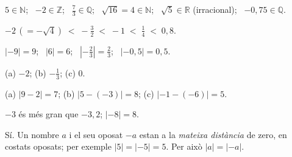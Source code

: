 \begin{solucions}
\begin{sollist}
  \item $5\in\mathbb{N}$; \ $-2\in\mathbb{Z}$; \ $\tfrac{7}{3}\in\mathbb{Q}$; \
        $\sqrt{16}=4\in\mathbb{N}$; \ $\sqrt{5}\in\mathbb{R}$ (irracional); \
        $-0,75\in\mathbb{Q}$.
  \item $-2\,(=-\sqrt{4}) \;<\; -\tfrac{3}{2} \;<\; -1 \;<\; \tfrac{1}{4} \;<\; 0,8$.
  \item $|{-9}|=9$; \ $|6|=6$; \ $\left|-\tfrac{2}{3}\right|=\tfrac{2}{3}$; \
        $|{-0,5}|=0,5$.
  \item (a) $-2$; \quad (b) $-\tfrac{1}{3}$; \quad (c) $0$.
  \item (a) $|9-2|=7$; \quad (b) $|5-(-3)|=8$; \quad (c) $|-1-(-6)|=5$.
  \item $-3$ és més gran que $-3,2$; \quad $|{-8}|=8$.
  \item Sí. Un nombre $a$ i el seu oposat $-a$ estan a la \emph{mateixa distància} de
        zero, en costats oposats; per exemple $|5|=|{-5}|=5$. Per això $|a|=|{-a}|$.
\end{sollist}
\end{solucions}
